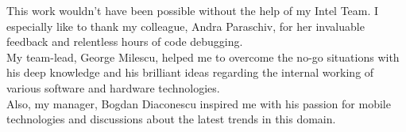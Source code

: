 \vspace*{7cm}
\begin{center}
This work wouldn't have been possible without the help of my Intel Team. I especially like to thank my colleague, Andra Paraschiv, for her invaluable feedback and relentless hours of code debugging.\\
My team-lead, George Milescu, helped me to overcome the no-go situations with his deep knowledge and his brilliant ideas regarding the internal working of various software and hardware technologies.\\
Also, my manager, Bogdan Diaconescu inspired me with his passion for mobile technologies and discussions about the latest trends in this domain.\\
\end{center}
\vspace{0.6cm}
\begin{center}
\end{center}
